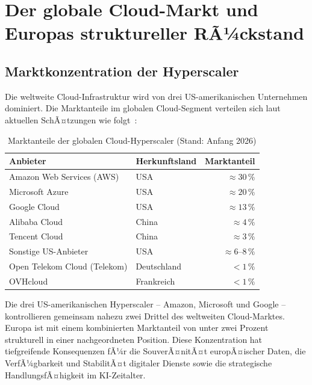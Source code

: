 ﻿\documentclass[12pt, a4paper, openany]{report}
\begin{document}
\section{Der globale Cloud-Markt und Europas struktureller RÃ¼ckstand}
\label{sec:cloud_markt}

\subsection{Marktkonzentration der Hyperscaler}

Die weltweite Cloud-Infrastruktur wird von drei US-amerikanischen
Unternehmen dominiert. Die Marktanteile im globalen Cloud-Segment verteilen
sich laut aktuellen SchÃ¤tzungen wie folgt~\cite{leipold2026chip}:

\begin{table}[H]
	\centering
	\caption{Marktanteile der globalen Cloud-Hyperscaler (Stand: Anfang 2026)}
	\label{tab:cloud_marktanteile}
	\begin{tabularx}{0.78\textwidth}{l l r}
		\toprule
		\textbf{Anbieter} & \textbf{Herkunftsland} & \textbf{Marktanteil} \\
		\midrule
		Amazon Web Services (AWS) & USA & $\approx 30\,\%$ \\
		Microsoft Azure            & USA & $\approx 20\,\%$ \\
		Google Cloud               & USA & $\approx 13\,\%$ \\
		\midrule
		Alibaba Cloud              & China & $\approx 4\,\%$ \\
		Tencent Cloud              & China & $\approx 3\,\%$ \\
		Sonstige US-Anbieter       & USA & $\approx 6$--$8\,\%$ \\
		\midrule
		Open Telekom Cloud (Telekom) & Deutschland & $< 1\,\%$ \\
		OVHcloud                   & Frankreich  & $< 1\,\%$ \\
		\bottomrule
	\end{tabularx}
\end{table}

\noindent
Die drei US-amerikanischen Hyperscaler -- Amazon, Microsoft und Google --
kontrollieren gemeinsam nahezu zwei Drittel des weltweiten Cloud-Marktes.
Europa ist mit einem kombinierten Marktanteil von unter zwei Prozent
strukturell in einer nachgeordneten Position. Diese Konzentration hat
tiefgreifende Konsequenzen fÃ¼r die SouverÃ¤nitÃ¤t europÃ¤ischer Daten, die
VerfÃ¼gbarkeit und StabilitÃ¤t digitaler Dienste sowie die strategische
HandlungsfÃ¤higkeit im KI-Zeitalter.
\end{document}
